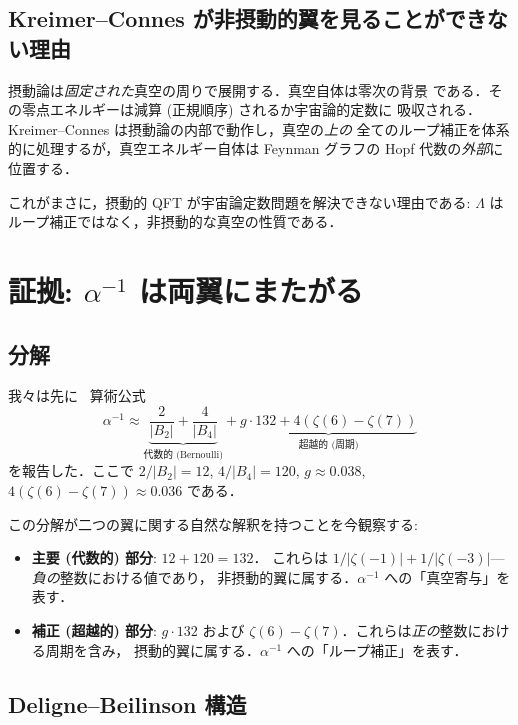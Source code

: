 \documentclass[11pt,a4paper]{article}
\begin{document}
\subsection{Kreimer--Connes が非摂動的翼を見ることができない理由}

摂動論は\emph{固定された}真空の周りで展開する．真空自体は零次の背景
である．その零点エネルギーは減算 (正規順序) されるか宇宙論的定数に
吸収される．Kreimer--Connes は摂動論の内部で動作し，真空の\emph{上の}
全てのループ補正を体系的に処理するが，真空エネルギー自体は Feynman
グラフの Hopf 代数の\emph{外部}に位置する．

これがまさに，摂動的 QFT が宇宙論定数問題を解決できない理由である:
$\Lambda$ はループ補正ではなく，非摂動的な真空の性質である．

\section{証拠: $\alpha^{-1}$ は両翼にまたがる}

\subsection{分解}

我々は先に~\cite{wb-alpha} 算術公式
\begin{equation}\label{eq:alpha}
\alpha^{-1} \approx \underbrace{\frac{2}{|B_2|} + \frac{4}{|B_4|}}_{\text{代数的 (Bernoulli)}}
+ \underbrace{g \cdot 132 + 4(\zeta(6) - \zeta(7))}_{\text{超越的 (周期)}}
\end{equation}
を報告した．ここで $2/|B_2| = 12$, $4/|B_4| = 120$, $g \approx 0.038$,
$4(\zeta(6) - \zeta(7)) \approx 0.036$ である．

この分解が二つの翼に関する自然な解釈を持つことを今観察する:

\begin{itemize}
\item \textbf{主要 (代数的) 部分}: $12 + 120 = 132$．
これらは $1/|\zeta(-1)| + 1/|\zeta(-3)|$---\emph{負の}整数における値であり，
非摂動的翼に属する．$\alpha^{-1}$ への「真空寄与」を表す．

\item \textbf{補正 (超越的) 部分}: $g \cdot 132$ および
$\zeta(6) - \zeta(7)$．これらは\emph{正の}整数における周期を含み，
摂動的翼に属する．$\alpha^{-1}$ への「ループ補正」を表す．
\end{itemize}

\subsection{Deligne--Beilinson 構造}
\end{document}
